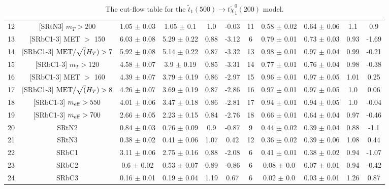 \documentclass[12pt]{article}
\begin{document}
\begin{table}[h!]
\begin{center}
{\begin{tabular}{c|c||c|c|>{\columncolor{yellow}}c|c||c|c|c|>{\columncolor{yellow}}c|c}
12 & [SRtN3] $m_T > 200$ & 1.05 $\pm$ 0.03 & 1.05 $\pm$ 0.1 & 1.0 & -0.03 & 11 & 0.58 $\pm$ 0.02 & 0.64 $\pm$ 0.06 & 1.1 & 0.9 \\
13 & [SRbC1-3] MET $>$ 150 & 6.03 $\pm$ 0.08 & 5.29 $\pm$ 0.22 & 0.88 & -3.12 & 6 & 0.79 $\pm$ 0.01 & 0.73 $\pm$ 0.03 & 0.93 & -1.69 \\
14 & [SRbC1-3] ${\rm MET}/\sqrt(H_T) > 7$ & 5.92 $\pm$ 0.08 & 5.14 $\pm$ 0.22 & 0.87 & -3.32 & 13 & 0.98 $\pm$ 0.01 & 0.97 $\pm$ 0.04 & 0.99 & -0.21 \\
15 & [SRbC1-3] $m_T > 120$ & 4.58 $\pm$ 0.07 & 3.9 $\pm$ 0.19 & 0.85 & -3.31 & 14 & 0.77 $\pm$ 0.01 & 0.76 $\pm$ 0.04 & 0.98 & -0.38 \\
16 & [SRbC1-3] MET $>$ 160 & 4.39 $\pm$ 0.07 & 3.79 $\pm$ 0.19 & 0.86 & -2.97 & 15 & 0.96 $\pm$ 0.01 & 0.97 $\pm$ 0.05 & 1.01 & 0.25 \\
17 & [SRbC1-3] ${\rm MET}/\sqrt(H_T) > 8$ & 4.26 $\pm$ 0.07 & 3.69 $\pm$ 0.19 & 0.87 & -2.86 & 16 & 0.97 $\pm$ 0.01 & 0.97 $\pm$ 0.05 & 1.0 & 0.06 \\
18 & [SRbC1-3] $m_{\rm eff} > 550$ & 4.01 $\pm$ 0.06 & 3.47 $\pm$ 0.18 & 0.86 & -2.81 & 17 & 0.94 $\pm$ 0.01 & 0.94 $\pm$ 0.05 & 1.0 & -0.04 \\
19 & [SRbC1-3] $m_{\rm eff} > 700$ & 2.66 $\pm$ 0.05 & 2.23 $\pm$ 0.15 & 0.84 & -2.76 & 18 & 0.66 $\pm$ 0.01 & 0.64 $\pm$ 0.04 & 0.97 & -0.46 \\
20 & SRtN2 & 0.84 $\pm$ 0.03 & 0.76 $\pm$ 0.09 & 0.9 & -0.87 & 9 & 0.44 $\pm$ 0.02 & 0.39 $\pm$ 0.04 & 0.88 & -1.1 \\
21 & SRtN3 & 0.38 $\pm$ 0.02 & 0.41 $\pm$ 0.06 & 1.07 & 0.42 & 12 & 0.36 $\pm$ 0.02 & 0.39 $\pm$ 0.06 & 1.08 & 0.44 \\
22 & SRbC1 & 3.11 $\pm$ 0.06 & 2.75 $\pm$ 0.16 & 0.88 & -2.08 & 6 & 0.41 $\pm$ 0.01 & 0.38 $\pm$ 0.02 & 0.94 & -1.07 \\
23 & SRbC2 & 0.6 $\pm$ 0.02 & 0.53 $\pm$ 0.07 & 0.89 & -0.86 & 6 & 0.08 $\pm$ 0.0 & 0.07 $\pm$ 0.01 & 0.94 & -0.42 \\
24 & SRbC3 & 0.16 $\pm$ 0.01 & 0.19 $\pm$ 0.04 & 1.19 & 0.67 & 6 & 0.02 $\pm$ 0.0 & 0.03 $\pm$ 0.01 & 1.26 & 0.87 \\
\hline
\end{tabular}
}
\caption{\small 
        The cut-flow table for the $\tilde t_1(500) \to t \tilde \chi_1^0(200)$ model.
    }
\label{tab:cflow_mT1-mN1_500-200}
\end{center}
\label{default}
\end{table}
        
        
\end{document}
